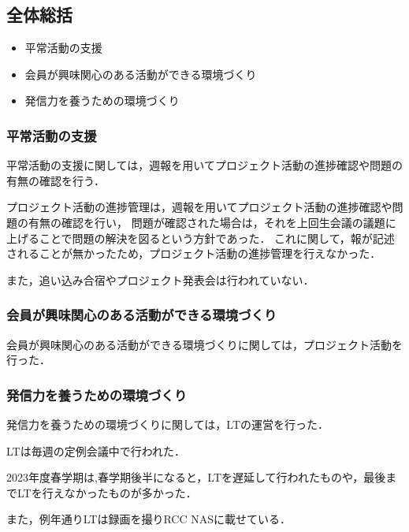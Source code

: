 \subsection*{全体総括}


\begin{itemize}
    \item 平常活動の支援
    \item 会員が興味関心のある活動ができる環境づくり
    \item 発信力を養うための環境づくり
  \end{itemize}
  
  \subsubsection*{平常活動の支援}
  平常活動の支援に関しては，週報を用いてプロジェクト活動の進捗確認や問題の有無の確認を行う．
  
  プロジェクト活動の進捗管理は，週報を用いてプロジェクト活動の進捗確認や問題の有無の確認を行い，
  問題が確認された場合は，それを上回生会議の議題に上げることで問題の解決を図るという方針であった．
  これに関して，報が記述されることが無かったため，プロジェクト活動の進捗管理を行えなかった．
  
  また，追い込み合宿やプロジェクト発表会は行われていない．
  
  \subsubsection*{会員が興味関心のある活動ができる環境づくり}
  会員が興味関心のある活動ができる環境づくりに関しては，プロジェクト活動を行った．
  
  \subsubsection*{発信力を養うための環境づくり}
  発信力を養うための環境づくりに関しては，LTの運営を行った．
  
  LTは毎週の定例会議中で行われた．
  
  2023年度春学期は,春学期後半になると，LTを遅延して行われたものや，最後までLTを行えなかったものが多かった．
  
  また，例年通りLTは録画を撮りRCC NASに載せている．
  
